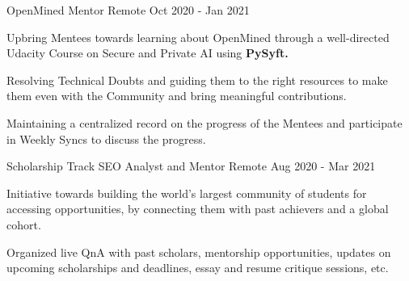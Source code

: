 

\begin{cventries}

  \extraentry
  {OpenMined}
  {Mentor}
  {Remote}
  {Oct 2020 - Jan 2021}
  {
    \begin{cvitems}
      \item{Upbring Mentees towards learning about OpenMined through a well-directed Udacity Course on Secure and Private AI using \textbf{PySyft.}}
      \item{Resolving Technical Doubts and guiding them to the right resources to make them even with the Community and bring meaningful contributions.}
      \item{Maintaining a centralized record on the progress of the Mentees and participate in Weekly Syncs to discuss the progress.}
    \end{cvitems}
  }

  \extraentry
  {Scholarship Track}
  {SEO Analyst and Mentor}
  {Remote}
  {Aug 2020 - Mar 2021}
  {
    \begin{cvitems} 
      \item Initiative towards building the world’s largest community of students for accessing opportunities, by connecting them with past achievers and a global cohort.
      \item Organized live QnA with past scholars, mentorship opportunities, updates on upcoming scholarships and deadlines, essay and resume critique sessions, etc.
    \end{cvitems}
  }
  \vspace{-0.3cm}

\end{cventries}
